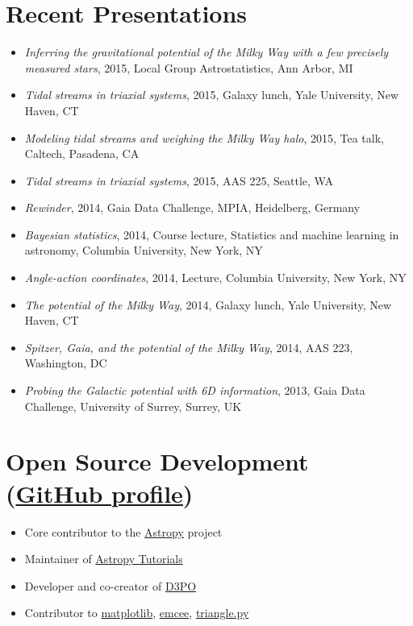 \documentclass[12pt,letterpaper]{article}
\begin{document}
\section*{Recent Presentations}

\begin{itemize}
	\item \emph{Inferring the gravitational potential of the Milky Way with a few precisely measured stars}, 2015, Local Group Astrostatistics, Ann Arbor, MI
	\item \emph{Tidal streams in triaxial systems}, 2015, Galaxy lunch, Yale University, New Haven, CT
	\item \emph{Modeling tidal streams and weighing the Milky Way halo}, 2015, Tea talk, Caltech, Pasadena, CA
	\item \emph{Tidal streams in triaxial systems}, 2015, AAS 225, Seattle, WA
	\item \emph{Rewinder}, 2014, Gaia Data Challenge, MPIA, Heidelberg, Germany
	\item \emph{Bayesian statistics}, 2014, Course lecture, Statistics and machine learning in astronomy, Columbia University, New York, NY
	\item \emph{Angle-action coordinates}, 2014, Lecture, Columbia University, New York, NY
	\item \emph{The potential of the Milky Way}, 2014, Galaxy lunch, Yale University, New Haven, CT
	\item \emph{Spitzer, Gaia, and the potential of the Milky Way}, 2014, AAS 223, Washington, DC
	\item \emph{Probing the Galactic potential with 6D information}, 2013, Gaia Data Challenge, University of Surrey, Surrey, UK

\end{itemize}

\section*{Open Source Development (\href{https://github.com/adrn}{GitHub profile})}
\begin{itemize}
	
	\item Core contributor to the \href{http://www.astropy.org/}{Astropy} project
	\item Maintainer of \href{http://tutorials.astropy.org/}{Astropy Tutorials}
	\item Developer and co-creator of \href{http://d3po.org}{D3PO}
	\item Contributor to \href{http://matplotlib.org/}{matplotlib}, \href{http://dan.iel.fm/emcee/current/}{emcee}, \href{https://github.com/dfm/triangle.py}{triangle.py}

\end{itemize}
\end{document}
